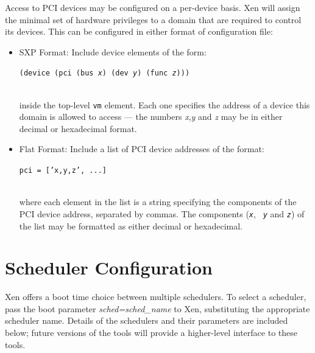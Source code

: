 \documentclass[11pt,twoside,final,openright]{report}
\begin{document}
{Access to PCI devices may be configured on a per-device basis.  Xen
will assign the minimal set of hardware privileges to a domain that
are required to control its devices.  This can be configured in either
format of configuration file:

\begin{itemize}
\item SXP Format: Include device elements of the form: \\
\centerline{  {\tt (device (pci (bus {\em x}) (dev {\em y}) (func {\em z})))}} \\
  inside the top-level {\tt vm} element.  Each one specifies the address
  of a device this domain is allowed to access ---
  the numbers {\em x},{\em y} and {\em z} may be in either decimal or
  hexadecimal format.
\item Flat Format: Include a list of PCI device addresses of the
  format: \\ 
\centerline{{\tt pci = ['x,y,z', ...]}} \\ 
where each element in the
  list is a string specifying the components of the PCI device
  address, separated by commas.  The components ({\tt \em x}, {\tt \em
  y} and {\tt \em z}) of the list may be formatted as either decimal
  or hexadecimal.
\end{itemize}








\section{Scheduler Configuration}
\label{s:sched} 


Xen offers a boot time choice between multiple schedulers.  To select
a scheduler, pass the boot parameter {\em sched=sched\_name} to Xen,
substituting the appropriate scheduler name.  Details of the schedulers
and their parameters are included below; future versions of the tools
will provide a higher-level interface to these tools.

}
\end{document}

